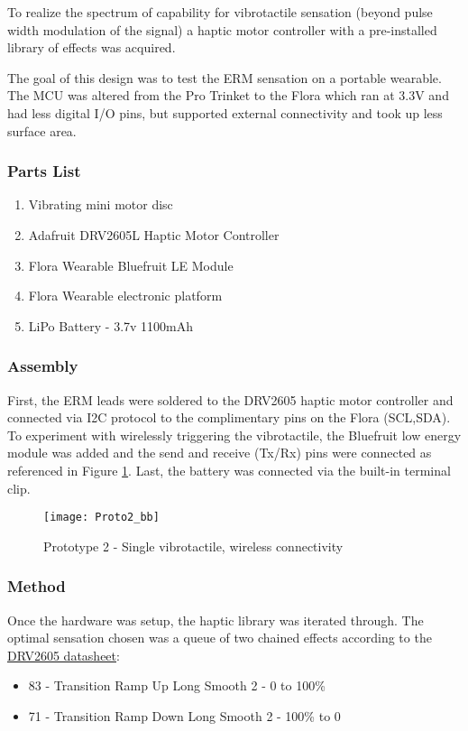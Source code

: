 To realize the spectrum of capability for vibrotactile sensation (beyond pulse width modulation of the signal) a haptic motor controller with a pre-installed library of effects was acquired. 

The goal of this design was to test the ERM sensation on a portable wearable. The MCU was altered from the Pro Trinket to the Flora which ran at 3.3V and had less digital I/O pins, but supported external connectivity and took up less surface area.

\subsubsection{Parts List}
\begin{enumerate}
    \item Vibrating mini motor disc
    \item Adafruit DRV2605L Haptic Motor Controller
    \item Flora Wearable Bluefruit LE Module
    \item Flora Wearable electronic platform
    \item LiPo Battery - 3.7v 1100mAh
\end{enumerate}
\subsubsection{Assembly}
    First, the ERM leads were soldered to the DRV2605 haptic motor controller and connected via I2C protocol to the complimentary pins on the Flora (SCL,SDA).
    To experiment with wirelessly triggering the vibrotactile, the Bluefruit low energy module was added and the send and receive (Tx/Rx) pins were connected as referenced in Figure \ref{Proto2}. Last, the battery was connected via the built-in terminal clip.


    \begin{figure}[H]
        \texttt{[image: Proto2\_bb]}
        \caption{Prototype 2 - Single vibrotactile, wireless connectivity}
        \label{Proto2}
    \end{figure}

\subsubsection{Method}
    Once the hardware was setup, the haptic library was iterated through. The optimal sensation chosen was a queue of two chained effects according to the \underline{DRV2605 datasheet}:
    \begin{itemize}
        \item 83 - Transition Ramp Up Long Smooth 2 - 0 to 100\%
        \item 71 - Transition Ramp Down Long Smooth 2 - 100\% to 0
    \end{itemize}

